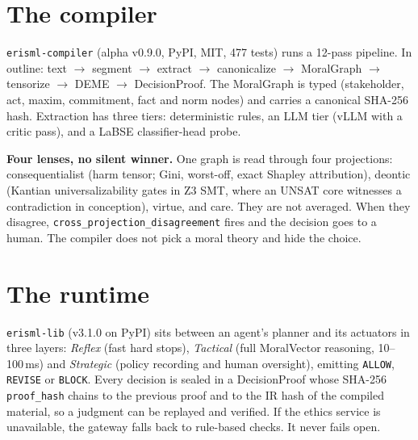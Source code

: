 \documentclass[11pt,twocolumn]{extarticle}
\begin{document}
\section{The compiler}
\texttt{erisml-compiler} (alpha v0.9.0, PyPI, MIT, 477 tests) runs a 12-pass pipeline. In
outline: text $\to$ segment $\to$ extract $\to$ canonicalize $\to$ MoralGraph $\to$
tensorize $\to$ DEME $\to$ DecisionProof. The MoralGraph is typed (stakeholder, act,
maxim, commitment, fact and norm nodes) and carries a canonical SHA-256 hash. Extraction
has three tiers: deterministic rules, an LLM tier (vLLM with a critic pass), and a LaBSE
classifier-head probe.

\textbf{Four lenses, no silent winner.} One graph is read through four projections:
consequentialist (harm tensor; Gini, worst-off, exact Shapley attribution), deontic
(Kantian universalizability gates in Z3 SMT, where an UNSAT core witnesses a
contradiction in conception), virtue, and care. They are not averaged. When they disagree,
\texttt{cross\_projection\_disagreement} fires and the decision goes to a human. The
compiler does not pick a moral theory and hide the choice.

\section{The runtime}
\texttt{erisml-lib} (v3.1.0 on PyPI) sits between an agent's planner and its actuators in
three layers: \emph{Reflex} (fast hard stops), \emph{Tactical} (full MoralVector reasoning,
10--100\,ms) and \emph{Strategic} (policy recording and human oversight), emitting
\texttt{ALLOW}, \texttt{REVISE} or \texttt{BLOCK}. Every decision is sealed in a
DecisionProof whose SHA-256 \texttt{proof\_hash} chains to the previous proof and to the
IR hash of the compiled material, so a judgment can be replayed and verified. If the
ethics service is unavailable, the gateway falls back to rule-based checks. It never
fails open.
\end{document}
